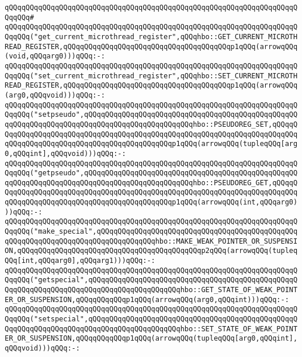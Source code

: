 \verb|qQQqqQQqqQQqqQQqqQQqqQQqqQQqqQQqqQQqqQQqqQQqqQQqqQQqqQQqqQQqqQQqqQQqqQQqqQQq#|\newline
\verb|qQQqqQQqqQQqqQQqqQQqqQQqqQQqqQQqqQQqqQQqqQQqqQQqqQQqqQQqqQQqqQQqqQQqqQQqqQQq("get_current_microthread_register",qQQqhbo::GET_CURRENT_MICROTHREAD_REGISTER,qQQqqQQqqQQqqQQqqQQqqQQqqQQqqQQqqQQqqQQqp1qQQq(arrowqQQq(void,qQQqarg0)))qQQq:-:|\newline
\verb|qQQqqQQqqQQqqQQqqQQqqQQqqQQqqQQqqQQqqQQqqQQqqQQqqQQqqQQqqQQqqQQqqQQqqQQqqQQq("set_current_microthread_register",qQQqhbo::SET_CURRENT_MICROTHREAD_REGISTER,qQQqqQQqqQQqqQQqqQQqqQQqqQQqqQQqqQQqqQQqp1qQQq(arrowqQQq(arg0,qQQqvoid)))qQQq:-:|\newline
\newline
\verb|qQQqqQQqqQQqqQQqqQQqqQQqqQQqqQQqqQQqqQQqqQQqqQQqqQQqqQQqqQQqqQQqqQQqqQQqqQQq("setpseudo",qQQqqQQqqQQqqQQqqQQqqQQqqQQqqQQqqQQqqQQqqQQqqQQqqQQqqQQqqQQqqQQqqQQqqQQqqQQqqQQqqQQqqQQqqQQqqQQqhbo::PSEUDOREG_SET,qQQqqQQqqQQqqQQqqQQqqQQqqQQqqQQqqQQqqQQqqQQqqQQqqQQqqQQqqQQqqQQqqQQqqQQqqQQqqQQqqQQqqQQqqQQqqQQqqQQqqQQqqQQqqQQqqQQqp1qQQq(arrowqQQq(tupleqQQq[arg0,qQQqint],qQQqvoid)))qQQq:-:|\newline
\verb|qQQqqQQqqQQqqQQqqQQqqQQqqQQqqQQqqQQqqQQqqQQqqQQqqQQqqQQqqQQqqQQqqQQqqQQqqQQq("getpseudo",qQQqqQQqqQQqqQQqqQQqqQQqqQQqqQQqqQQqqQQqqQQqqQQqqQQqqQQqqQQqqQQqqQQqqQQqqQQqqQQqqQQqqQQqqQQqqQQqhbo::PSEUDOREG_GET,qQQqqQQqqQQqqQQqqQQqqQQqqQQqqQQqqQQqqQQqqQQqqQQqqQQqqQQqqQQqqQQqqQQqqQQqqQQqqQQqqQQqqQQqqQQqqQQqqQQqqQQqqQQqqQQqqQQqp1qQQq(arrowqQQq(int,qQQqarg0)))qQQq:-:|\newline
\verb|qQQqqQQqqQQqqQQqqQQqqQQqqQQqqQQqqQQqqQQqqQQqqQQqqQQqqQQqqQQqqQQqqQQqqQQqqQQq("make_special",qQQqqQQqqQQqqQQqqQQqqQQqqQQqqQQqqQQqqQQqqQQqqQQqqQQqqQQqqQQqqQQqqQQqqQQqqQQqqQQqqQQqhbo::MAKE_WEAK_POINTER_OR_SUSPENSION,qQQqqQQqqQQqqQQqqQQqqQQqqQQqqQQqqQQqqQQqqQQqp2qQQq(arrowqQQq(tupleqQQq[int,qQQqarg0],qQQqarg1)))qQQq:-:|\newline
\verb|qQQqqQQqqQQqqQQqqQQqqQQqqQQqqQQqqQQqqQQqqQQqqQQqqQQqqQQqqQQqqQQqqQQqqQQqqQQq("getspecial",qQQqqQQqqQQqqQQqqQQqqQQqqQQqqQQqqQQqqQQqqQQqqQQqqQQqqQQqqQQqqQQqqQQqqQQqqQQqqQQqqQQqqQQqqQQqhbo::GET_STATE_OF_WEAK_POINTER_OR_SUSPENSION,qQQqqQQqqQQqp1qQQq(arrowqQQq(arg0,qQQqint)))qQQq:-:|\newline
\verb|qQQqqQQqqQQqqQQqqQQqqQQqqQQqqQQqqQQqqQQqqQQqqQQqqQQqqQQqqQQqqQQqqQQqqQQqqQQq("setspecial",qQQqqQQqqQQqqQQqqQQqqQQqqQQqqQQqqQQqqQQqqQQqqQQqqQQqqQQqqQQqqQQqqQQqqQQqqQQqqQQqqQQqqQQqqQQqhbo::SET_STATE_OF_WEAK_POINTER_OR_SUSPENSION,qQQqqQQqqQQqp1qQQq(arrowqQQq(tupleqQQq[arg0,qQQqint],qQQqvoid)))qQQq:-:|\newline
